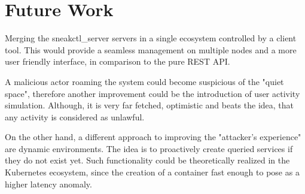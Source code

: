 \section{Future Work \label{conclusion:future}}

Merging the sneakctl\_server servers in a single ecosystem controlled by a client tool. This would provide a seamless management on multiple nodes and a more user friendly interface, in comparison to the pure REST API.

A malicious actor roaming the system could become suspicious of the "quiet space", therefore another improvement could be the introduction of user activity simulation. Although, it is very far fetched, optimistic and beats the idea, that any activity is considered as unlawful.

On the other hand, a different approach to improving the "attacker's experience" are dynamic environments. The idea is to proactively create queried services if they do not exist yet. Such functionality could be theoretically realized in the Kubernetes ecosystem, since the creation of a container fast enough to pose as a higher latency anomaly.